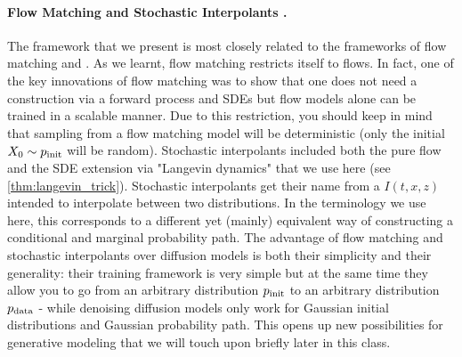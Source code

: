 \paragraph{Flow Matching \citep{lipman2022flow} and Stochastic Interpolants \citep{albergo2023stochastic}.}  The framework that we present is most closely related to the frameworks of flow matching and . As we learnt, flow matching restricts itself to flows. In fact, one of the key innovations of flow matching was to show that one does not need a construction via a forward process and SDEs but flow models alone can be trained in a scalable manner. Due to this restriction, you should keep in mind that sampling from a flow matching model will be  deterministic (only the initial $X_0\sim p_{\rm{init}}$ will be random). Stochastic interpolants included both the pure flow and the SDE extension via "Langevin dynamics" that we use here (see \cref{thm:langevin_trick}). Stochastic interpolants get their name from a  $I(t,x,z)$ intended to interpolate between two distributions. In the terminology we use here, this corresponds to a different yet (mainly) equivalent way of constructing a conditional and marginal probability path. The advantage of flow matching and stochastic interpolants over diffusion models is both their simplicity and their generality: their training framework is very simple but at the same time they allow you to go from an arbitrary distribution $p_{\rm{init}}$ to an arbitrary distribution $p_{\rm{data}}$ - while denoising diffusion models only work for Gaussian initial distributions and  Gaussian probability path. This opens up new possibilities for generative modeling that we will touch upon briefly later in this class.


